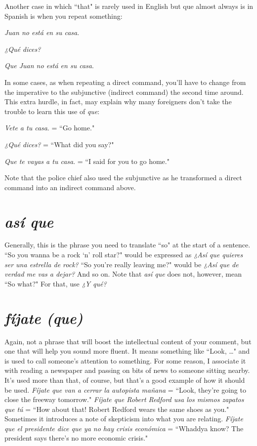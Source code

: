 Another case in which ``that" is rarely used in English but que
almost always is in Spanish is when you repeat something:

\bsk

\indu \emph{Juan no está en su casa}.

\indu \emph{¿Qué dices?}

\indu \emph{Que Juan no está en su casa}.

\bsk

In some cases, as when repeating a direct command, you'll have to
change from the imperative to the subjunctive (indirect command) the
second time around. This extra hurdle, in fact, may explain why many
foreigners don't take the trouble to learn this use of \emph{que}:

\bsk

\indu \emph{Vete a tu casa}. = ``Go home."

\indu \emph{¿Qué dices?} = ``What did you say?"

\indu \emph{Que te vayas a tu casa}. = ``I said for you to go home."

\bsk

Note that the police chief also used the subjunctive as he transformed
a direct command into an indirect command above.

\section{\emph{así que}}

Generally, this is the phrase you need to translate ``so" at the
start of a sentence. ``So you wanna be a rock `n' roll star?" would be
expressed as \emph{¿Así que quieres ser una estrella de rock?} ``So you're
really leaving me?" would be \emph{¿Así que de verdad me vas a dejar?} And
so on. Note that \emph{así que} does not, however, mean ``So what?" For that,
use \emph{¿Y qué?}

\section{\emph{fíjate (que)}}

Again, not a phrase that will boost the intellectual content of
your comment, but one that will help you sound more fluent. It means
something like ``Look, \ldots{}" and is used to call someone's attention to
something. For some reason, I associate it with reading a newspaper
and passing on bits of news to someone sitting nearby. It's used more
than that, of course, but that's a good example of how it should be
used. \emph{Fíjate que van a cerrar la autopista mañana} = ``Look, they're
going to close the freeway tomorrow." \emph{Fíjate que Robert Redford usa
	los mismos zapatos que tú} = ``How about that! Robert Redford wears
the same shoes as you." Sometimes it introduces a note of skepticism
into what you are relating. \emph{Fíjate que el presidente dice que ya no hay
	crisis económica} = ``Whaddya know? The president says there's no
more economic crisis."

